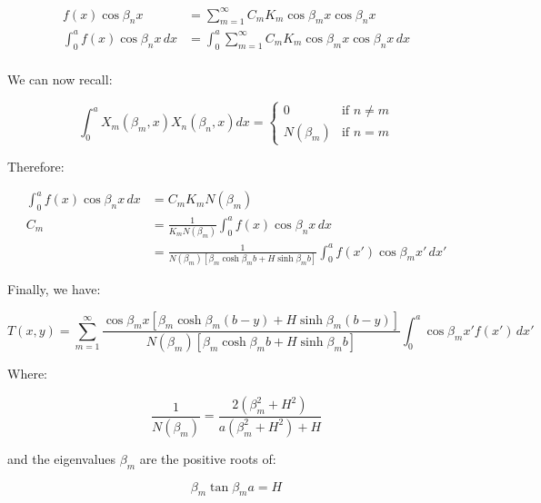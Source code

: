 \documentclass[letterpaper,12pt]{article}
\begin{document}
\begin{equation}
\begin{aligned}
    f(x) \cos{\beta_n x}                    &= \sum_{m = 1}^{\infty} C_m K_m \cos{\beta_m x} \cos{\beta_n x} \\
    \int_{0}^{a} f(x) \cos{\beta_n x} \, dx &= \int_{0}^{a} \sum_{m = 1}^{\infty} C_m K_m \cos{\beta_m x} \cos{\beta_n x} \, dx \\
\end{aligned}
\end{equation}

We can now recall:

\begin{equation}
    \int_{0}^{a} X_m(\beta_m, x) X_n(\beta_n, x) dx = \begin{cases}
        0 & \text{if } n \neq m \\
        N(\beta_m) & \text{if } n = m
    \end{cases}
\end{equation}

Therefore:

\begin{equation}
\begin{aligned}
    \int_{0}^{a} f(x) \cos{\beta_n x} \, dx &= C_m K_m N(\beta_m) \\
    C_m &= \frac{1}{K_m N(\beta_m)} \int_{0}^{a} f(x) \cos{\beta_n x} \, dx \\
        &= \frac{1}{N(\beta_m) [\beta_m \cosh{\beta_m b} + H \sinh{\beta_m b}]} \int_{0}^{a} f(x') \cos{\beta_m x'} \, dx' 
\end{aligned}
\end{equation}

Finally, we have:

\begin{equation}
\boxed{
    T(x, y) = \sum_{m = 1}^{\infty} \frac{\cos{\beta_m x} \left[ \beta_m \cosh{\beta_m (b- y)} + H \sinh{\beta_m (b - y)} \right]}{N(\beta_m) [\beta_m \cosh{\beta_m b} + H \sinh{\beta_m b}]} \int_{0}^{a} \cos{\beta_m x'} f(x')  \, dx' 
}  
\end{equation}

Where:

\begin{equation}
    \frac{1}{N\left(\beta_m\right)} = \frac{2 \left(\beta^{2}_m + H^2 \right)}{a \left(\beta^{2}_m + H^2 \right) + H}
\end{equation}

and the eigenvalues $\beta_m$ are the positive roots of:

\begin{equation}
    \beta_m \tan{\beta_m a} = H
\end{equation}



\vspace{6pt}

\end{document}

